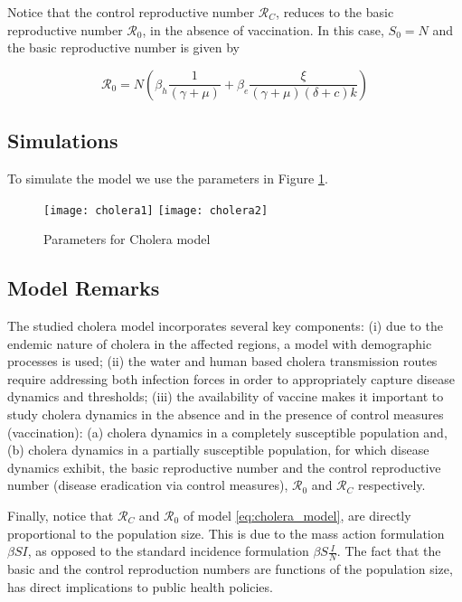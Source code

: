 \documentclass{book}\usepackage[]{graphicx}\usepackage[]{color}
\begin{document}
Notice that the control reproductive number $\mathcal{R}_C$, reduces to the basic reproductive number $\mathcal{R}_0$, in the absence of vaccination. In this case, $S_0=N$ and the basic reproductive number is given by

    \begin{equation}
    \mathcal{R}_0=N\left(\beta_{h} \frac{ 1}{(\gamma+\mu)}+\beta_{e} \frac{ \xi}{(\gamma+\mu)(\delta+c) k}\right)
\end{equation}

\subsection*{Simulations}
To simulate the model we use the parameters in Figure \ref{fig:cholera_pars}.

%
\begin{figure}[H]
    \centering
    \texttt{[image: cholera1]}
    \texttt{[image: cholera2]}
    \caption{Parameters for Cholera model}
    \label{fig:cholera_pars}
\end{figure}

\subsection*{Model Remarks}
The studied cholera model incorporates several key components: 
%
(i) due to the endemic nature of cholera in the affected regions, a model with demographic processes is used;
%
(ii) the water and human based cholera transmission routes require addressing both infection forces in order to appropriately capture disease dynamics and thresholds;
%
(iii) the availability of vaccine makes it important to study cholera dynamics in the absence and in the presence of control measures (vaccination): (a) cholera dynamics in a completely susceptible population and, (b) cholera dynamics in a partially susceptible population, for which disease dynamics exhibit, the basic reproductive number and the control reproductive number (disease eradication via control measures), $\mathcal{R}_0$ and $\mathcal{R}_C$ respectively.

Finally, notice that $\mathcal{R}_C$ and $\mathcal{R}_0$ of model \eqref{eq:cholera_model}, are directly proportional to the population size. This is due to the mass action formulation $\beta SI$, as opposed to the standard incidence formulation $\beta S \frac{I}{N}$. The fact that the basic and the control reproduction numbers are functions of the population size, has direct implications to public health policies.
\end{document}
